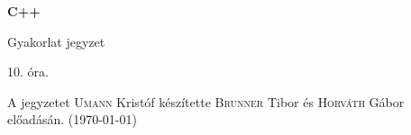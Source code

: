 \documentclass[a4paper,11.5pt]{article}
\begin{document}
	\setlength\parindent{0pt}
	\def\s{\hspace{0.2mm}\vphantom{\beta}}
	\def\Z{\mathbb{Z}}
	\def\Q{\mathbb{Q}}
	\def\R{\mathbb{R}}
	\def\C{\mathbb{C}}
	\def\N{\mathbb{N}}
	\def\Ra{\overline{\mathbb{R}}}
	
	\def\sume{\displaystyle\sum_{n=1}^{+\infty}}
	\def\sumn{\displaystyle\sum_{n=0}^{+\infty}}
	
	\def\narrow{\underset{n\rightarrow+\infty}{\longrightarrow}}
	\def\limn{\displaystyle\lim_{n\to +\infty}}
	\def\limx{\displaystyle\lim_{x\to +\infty}}
	
	\theoremstyle{definition}
	\newtheorem{theorem}{Tétel}[subsection] 
	
	\theoremstyle{definition}
	\newtheorem{definition}[theorem]{Definíció} 
	\newtheorem{example}[theorem]{Példa} 
	\newtheorem{task}[theorem]{Feladat} 
	\newtheorem{note}[theorem]{Megjegyzés}
	\begin{center}
		{\LARGE\textbf{C++}}
		
		{\Large Gyakorlat jegyzet}
		
		10. óra.
	\end{center}
	A jegyzetet \textsc{Umann} Kristóf készítette \textsc{Brunner} Tibor és \textsc{Horváth} Gábor előadásán. (\today)
\end{document}
